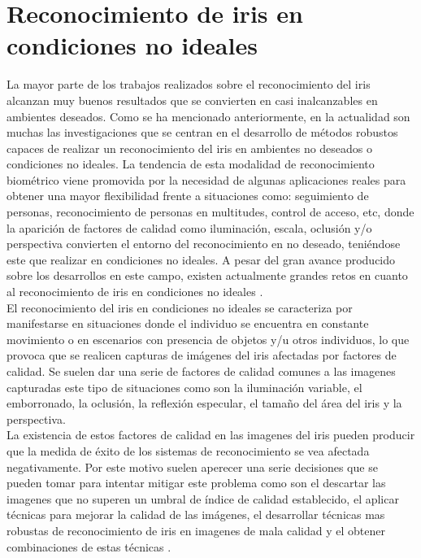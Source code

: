 \section{Reconocimiento de iris en condiciones no ideales}

La mayor parte de los trabajos realizados sobre el reconocimiento del iris alcanzan muy buenos resultados que se convierten en casi inalcanzables en ambientes deseados. Como se ha mencionado anteriormente, en la actualidad son muchas las investigaciones que se centran en el desarrollo de métodos robustos capaces de realizar un reconocimiento del iris en ambientes no deseados o condiciones no ideales. La tendencia de esta modalidad de reconocimiento biométrico viene promovida por la necesidad de algunas aplicaciones reales para obtener una mayor flexibilidad frente a situaciones como: seguimiento de personas, reconocimiento de personas en multitudes, control de acceso, etc, donde la aparición de factores de calidad como iluminación, escala, oclusión y/o perspectiva convierten el entorno del reconocimiento en no deseado, teniéndose este que realizar en condiciones no ideales. A pesar del gran avance producido sobre los desarrollos en este campo, existen actualmente grandes retos en cuanto al reconocimiento de iris en condiciones no ideales \cite{Reference9}.\\

El reconocimiento del iris en condiciones no ideales se caracteriza por manifestarse en situaciones donde el individuo se encuentra en constante movimiento o en escenarios con presencia de objetos y/u otros individuos, lo que provoca que se realicen capturas de imágenes del iris afectadas por factores de calidad. Se suelen dar una serie de factores de calidad comunes a las imagenes capturadas este tipo de situaciones como son la iluminación variable, el emborronado, la oclusión, la reflexión especular, el tamaño del área del iris y la perspectiva. \\
 
La existencia de estos factores de calidad en las imagenes del iris pueden producir que la medida de éxito de los sistemas de reconocimiento se vea afectada negativamente. Por este motivo suelen aperecer una serie decisiones que se pueden tomar para intentar mitigar este problema como son el descartar las imagenes que no superen un umbral de índice de calidad establecido, el aplicar técnicas para mejorar la calidad de las imágenes, el desarrollar técnicas mas robustas de reconocimiento de iris en imagenes de mala calidad y el obtener combinaciones de estas técnicas \cite{Reference9}.\\


